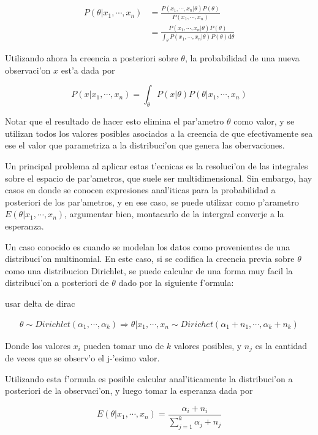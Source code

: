 \begin{align}
P(\theta|x_1,\cdots,x_n) &= \frac{P(x_1,\cdots,x_n|\theta) P(\theta)}{P(x_1,\cdots,x_n)} \\
                         &= \frac{P(x_1,\cdots,x_n|\theta) P(\theta)}{\int_\theta{P(x_1,\cdots,x_n|\theta)P(\theta)\mathrm{d}\theta}}
\end{align}

Utilizando ahora la creencia a posteriori sobre $\theta$, la probabilidad de una nueva observaci'on $x$ est'a dada por

$$P(x|x_1,\cdots,x_n) = \int_\theta{P(x|\theta)P(\theta|x_1,\cdots,x_n)}$$

Notar que el resultado de hacer esto elimina el par'ametro $\theta$ como valor, y se utilizan todos los valores posibles asociados a la creencia de que efectivamente
sea ese el valor que parametriza a la distribuci'on que genera las obervaciones.


Un principal problema al aplicar estas t'ecnicas es la resoluci'on de las integrales sobre el espacio de par'ametros, que suele ser multidimensional. 
Sin embargo, hay casos en donde se conocen expresiones anal'iticas para la probabilidad a posteriori de los par'ametros, y en ese caso, se puede utilizar
como p'arametro $E(\theta|x_1,\cdots,x_n)$, \alert{argumentar bien, montacarlo de la intergral converje a la esperanza}.

Un caso conocido es cuando se modelan los datos como provenientes de una distribuci'on multinomial. En este caso, si se codifica la creencia previa
sobre $\theta$ como una distribucion Dirichlet, se puede calcular de una forma muy facil la distribuci'on a posteriori de $\theta$ dado por la siguiente
f'ormula:

\alert{usar delta de dirac}

\begin{align}
    \theta \sim Dirichlet(\alpha_1,\cdots,\alpha_k) \Rightarrow \theta|x_1,\cdots,x_n \sim Dirichet(\alpha_1+n_1,\cdots,\alpha_k+n_k)
\end{align}

Donde los valores $x_i$ pueden tomar uno de $k$ valores posibles, y $n_j$ es la cantidad de veces que se observ'o el j-'esimo valor. 

Utilizando esta f'ormula es posible calcular anal'iticamente la distribuci'on a posteriori de la observaci'on, y luego tomar la esperanza dada por

$$E(\theta|x_1,\cdots,x_n)=\frac{\alpha_i + n_i}{\sum_{j=1}^{k}{\alpha_j+n_j}}$$

